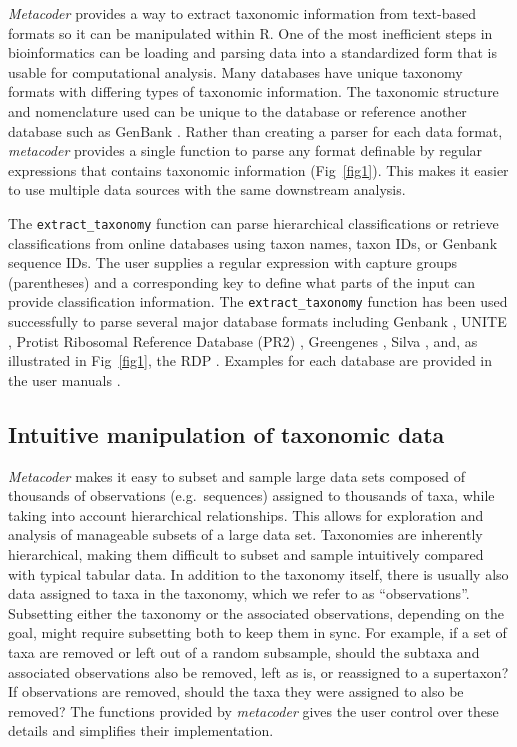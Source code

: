 \documentclass[10pt,letterpaper]{article}
\begin{document}
\emph{Metacoder} provides a way to extract taxonomic information from
text-based formats so it can be manipulated within R. One of the most
inefficient steps in bioinformatics can be loading and parsing data into
a standardized form that is usable for computational analysis. Many
databases have unique taxonomy formats with differing types of taxonomic
information. The taxonomic structure and nomenclature used can be unique
to the database or reference another database such as GenBank
\cite{benson2013genbank}. Rather than creating a parser for each data
format, \emph{metacoder} provides a single function to parse any format
definable by regular expressions that contains taxonomic information
(Fig~\ref{fig1}). This makes it easier to use multiple data sources with the
same downstream analysis.

The \texttt{extract\_taxonomy} function can parse hierarchical
classifications or retrieve classifications from online databases using
taxon names, taxon IDs, or Genbank sequence IDs. The user supplies a
regular expression with capture groups (parentheses) and a corresponding
key to define what parts of the input can provide classification
information. The \texttt{extract\_taxonomy} function has been used
successfully to parse several major database formats including Genbank
\cite{benson2013genbank}, UNITE \cite{koljalg2013towards}, Protist
Ribosomal Reference Database (PR2) \cite{guillou2012protist}, Greengenes
\cite{desantis2006greengenes}, Silva \cite{quast2013silva}, and, as
illustrated in Fig~\ref{fig1}, the RDP \cite{maidak1996ribosomal}. Examples
for each database are provided in the user manuals
\cite{foster2016metacoder_manual}.


\subsection*{Intuitive manipulation of taxonomic
	data}\label{intuitive-manipulation-of-taxonomic-data}

\emph{Metacoder} makes it easy to subset and sample large data sets
composed of thousands of observations (e.g.~sequences) assigned to
thousands of taxa, while taking into account hierarchical relationships.
This allows for exploration and analysis of manageable subsets of a
large data set. Taxonomies are inherently hierarchical, making them
difficult to subset and sample intuitively compared with typical tabular
data. In addition to the taxonomy itself, there is usually also data
assigned to taxa in the taxonomy, which we refer to as ``observations''.
Subsetting either the taxonomy or the associated observations, depending
on the goal, might require subsetting both to keep them in sync. For
example, if a set of taxa are removed or left out of a random subsample,
should the subtaxa and associated observations also be removed, left as
is, or reassigned to a supertaxon? If observations are removed, should
the taxa they were assigned to also be removed? The functions provided
by \emph{metacoder} gives the user control over these details and
simplifies their implementation.
\end{document}
